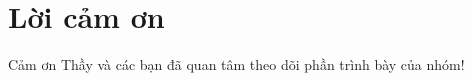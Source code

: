 \documentclass[17pt]{beamer}
\begin{document}
\section*{Lời cảm ơn}
\begin{frame}
\large \alert{Cảm ơn Thầy và các bạn đã quan tâm theo dõi phần trình bày của nhóm!}
\end{frame}
\end{document}
